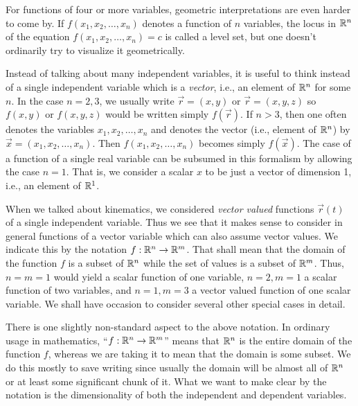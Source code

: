 For functions of four or more variables, geometric interpretations
are even harder to come by.  If $f(x_1,x_2,\dots,x_n)$ denotes
a function of $n$ variables, the locus in $\mathbb{R}^n$  of the
equation $f(x_1,x_2,\dots,x_n) = c$ is called a level set,
but one doesn't ordinarily try to visualize it geometrically.  

Instead of talking about many independent variables, it is useful
to think instead of a single independent variable which is a 
\emph{vector}, i.e., an element of $\mathbb{R}^n$ for some $n$.   In the
case  $n = 2, 3$, we usually write $\vec r = ( x,y )$ or
$\vec r = ( x,y,z )$ so $f(x,y)$ or $f(x,y,z)$ would be written 
simply $f(\vec r)$.  If $n > 3$, then one often denotes the
variables $x_1, x_2, \dots, x_n$ and denotes the vector
(i.e., element of $\mathbb{R}^n$) by $\vec x = (x_1,x_2, \dots, x_n)$.
Then $f(x_1,x_2, \dots, x_n)$ becomes simply  $f(\vec x)$.
The case of a function of a single real variable can be subsumed
in this formalism by allowing the case $n =1$.  That is,
we consider a scalar $x$ to be just a vector of dimension 1,
i.e., an element of $\mathbb{R}^1$.

When we talked about kinematics, we considered  \emph{vector valued}
functions $\vec r(t)$ of a single independent variable.    Thus we see
that it makes sense to consider in general functions of a vector
variable which can also assume vector values.   We indicate this
by the notation $f:\mathbb{R}^n \to \mathbb{R}^m$.   That shall mean that the domain
of the function $f$ is a subset of $\mathbb{R}^n$ while the set of values is
a subset of $\mathbb{R}^m$.    Thus, $n = m = 1$ would yield a scalar
function of one variable, $n = 2, m = 1$ a scalar function of two
variables, and $n = 1, m = 3$ a vector valued function of one scalar
variable.   We shall have occasion to consider several other special
cases in detail.

There is one slightly non-standard aspect to the above notation.
In ordinary usage in mathematics,
``$f:\mathbb{R}^n \to \mathbb{R}^m$'' means that $\mathbb{R}^n$ is the entire domain of the
function $f$, whereas we are taking it to mean that the domain is some
subset.    We do this mostly to save writing since usually the
domain will be almost all of $\mathbb{R}^n$  or at least some significant
chunk of it.  What we want to make clear by the notation is the
dimensionality of both the independent and dependent variables.


